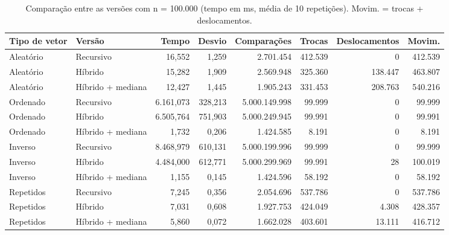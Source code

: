 \begin{table}[htbp]
  \centering
  \small
  \setlength{\tabcolsep}{4pt}
  \caption{Comparação entre as versões com n = 100.000 (tempo em ms, média de 10 repetições). Movim. = trocas + deslocamentos.}
  \label{tab:comparacao-n100000}
  \begin{tabular}{llrrrrrr}
    \toprule
    Tipo de vetor & Versão & Tempo & Desvio & Comparações & Trocas & Deslocamentos & Movim. \\
    \midrule
    Aleatório & Recursivo & 16,552 & 1,259 & 2.701.454 & 412.539 & 0 & 412.539 \\
    Aleatório & Híbrido & 15,282 & 1,909 & 2.569.948 & 325.360 & 138.447 & 463.807 \\
    Aleatório & Híbrido + mediana & 12,427 & 1,445 & 1.905.243 & 331.453 & 208.763 & 540.216 \\
    Ordenado & Recursivo & 6.161,073 & 328,213 & 5.000.149.998 & 99.999 & 0 & 99.999 \\
    Ordenado & Híbrido & 6.505,764 & 751,903 & 5.000.249.945 & 99.991 & 0 & 99.991 \\
    Ordenado & Híbrido + mediana & 1,732 & 0,206 & 1.424.585 & 8.191 & 0 & 8.191 \\
    Inverso & Recursivo & 8.468,979 & 610,131 & 5.000.199.996 & 99.999 & 0 & 99.999 \\
    Inverso & Híbrido & 4.484,000 & 612,771 & 5.000.299.969 & 99.991 & 28 & 100.019 \\
    Inverso & Híbrido + mediana & 1,155 & 0,145 & 1.424.596 & 58.192 & 0 & 58.192 \\
    Repetidos & Recursivo & 7,245 & 0,356 & 2.054.696 & 537.786 & 0 & 537.786 \\
    Repetidos & Híbrido & 7,031 & 0,608 & 1.927.753 & 424.049 & 4.308 & 428.357 \\
    Repetidos & Híbrido + mediana & 5,860 & 0,072 & 1.662.028 & 403.601 & 13.111 & 416.712 \\
    \bottomrule
  \end{tabular}
\end{table}
